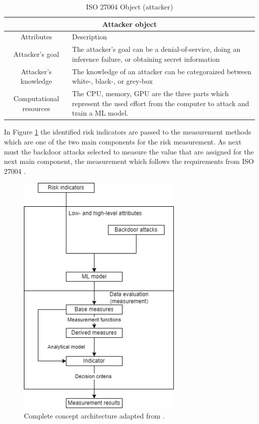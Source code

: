 \begin{table}[h]
\centering
  \begin{tabular}{| c | p{10cm} |}
  \hline
  \multicolumn{2}{|c|}{Attacker object} \\
  \hline
  \rowcolor{lightgray} Attributes & Description \\ [0.5ex]
  \hline
  Attacker's goal & The attacker's goal can be a denial-of-service, doing an inference failure, or obtaining secret information \\
  \hline
  Attacker's knowledge & The knowledge of an attacker can be categoraized between white-, black-, or grey-box \\
  \hline
  Computational resources & The CPU, memory, GPU are the three parts which represent the used effort from the computer to attack and train a ML model. \\
  \hline
  \end{tabular}
\caption{ISO 27004 Object (attacker)}
\label{tab:attacker}
\end{table}

In Figure \ref{fig:complete_architecture} the identified risk indicators are passed to the measurement methods which are one of the two main components for the risk measurement. As next must the backdoor attacks selected to measure the value that are assigned for the next main component, the measurement which follows the requirements from ISO 27004 \cite{ISO_27004_2009}.

\begin{figure}[ht!]
  \centering
  \includegraphics[width=8cm]{pictures/complete_architecture.png}
  \caption{Complete concept architecture adapted from \cite{ISO_27004_2009}.}
  \label{fig:complete_architecture}
\end{figure}

